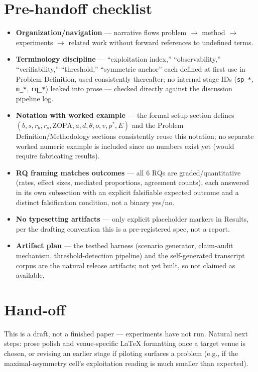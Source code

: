 \documentclass[11pt]{article}
\begin{document}
\section*{Pre-handoff checklist}
\begin{itemize}[leftmargin=1.4em]
\item \textbf{Organization/navigation} --- narrative flows problem $\to$ method $\to$ experiments $\to$ related work without forward references to undefined terms.
\item \textbf{Terminology discipline} --- ``exploitation index,'' ``observability,'' ``verifiability,'' ``threshold,'' ``symmetric anchor'' each defined at first use in Problem Definition, used consistently thereafter; no internal stage IDs (\texttt{sp\_*}, \texttt{m\_*}, \texttt{rq\_*}) leaked into prose --- checked directly against the discussion pipeline log.
\item \textbf{Notation with worked example} --- the formal setup section defines $(b, s, r_b, r_s, \mathrm{ZOPA}, a, d, \theta, o, v, p^*, E)$ and the Problem Definition/Methodology sections consistently reuse this notation; no separate worked numeric example is included since no numbers exist yet (would require fabricating results).
\item \textbf{RQ framing matches outcomes} --- all 6 RQs are graded/quantitative (rates, effect sizes, mediated proportions, agreement counts), each answered in its own subsection with an explicit falsifiable expected outcome and a distinct falsification condition, not a binary yes/no.
\item \textbf{No typesetting artifacts} --- only explicit placeholder markers in Results, per the drafting convention this is a pre-registered spec, not a report.
\item \textbf{Artifact plan} --- the testbed harness (scenario generator, claim-audit mechanism, threshold-detection pipeline) and the self-generated transcript corpus are the natural release artifacts; not yet built, so not claimed as available.
\end{itemize}

\section*{Hand-off}
This is a draft, not a finished paper --- experiments have not run. Natural next steps: prose polish and venue-specific LaTeX formatting once a target venue is chosen, or revising an earlier stage if piloting surfaces a problem (e.g., if the maximal-asymmetry cell's exploitation reading is much smaller than expected).
\end{document}

